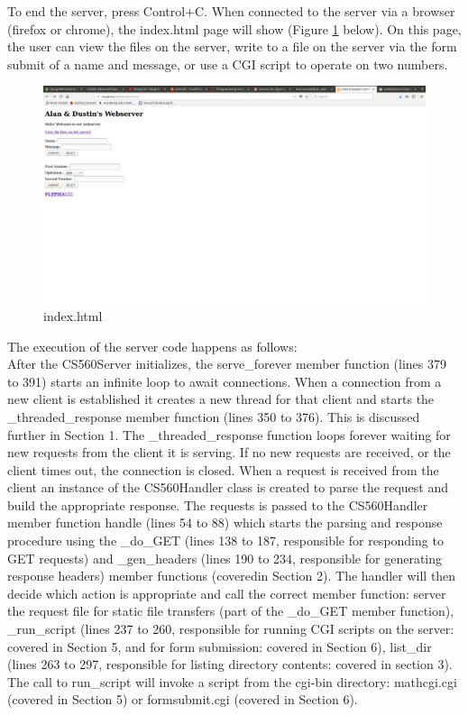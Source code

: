 \documentclass{article}
\begin{document}
To end the server, press Control+C. When connected to the server via a browser (firefox or chrome), the index.html page will show (Figure \ref{fig:index} below). On this page, the user can view the files on the server, write to a file on the server via the form submit of a name and message, or use a CGI script to operate on two numbers.
\begin{figure}[H]
	\includegraphics[width=\textwidth]{index.png}
	\centering
	\caption{index.html}
	\label{fig:index}
\end{figure}
The execution of the server code happens as follows: \\

After the CS560Server initializes, the serve\_forever member function (lines 379 to 391) starts an infinite loop to await connections. When a connection from a new client is established it creates a new thread for that client and starts the \_threaded\_response member function (lines 350 to 376). This is discussed further in Section 1. The \_threaded\_response function loops forever waiting for new requests from the client it is serving. If no new requests are received, or the client times out, the connection is closed. When a request is received from the client an instance of the CS560Handler class is created to parse the request and build the appropriate response. The requests is passed to the  CS560Handler member function handle (lines 54 to 88) which starts the parsing and response procedure using the \_do\_GET (lines 138 to 187, responsible for responding to GET requests) and \_gen\_headers (lines 190 to 234, responsible for generating response headers) member functions (coveredin Section 2). The handler will then decide which action is appropriate and call the correct member function:  server the request file for static file transfers (part of the \_do\_GET member function), \_run\_script (lines 237 to 260, responsible for running CGI scripts on the server: covered in Section 5, and for form submission: covered in Section 6), list\_dir (lines 263 to 297, responsible for listing directory contents: covered in section 3). The call to run\_script will invoke a script from the cgi-bin directory: mathcgi.cgi (covered in Section 5) or formsubmit.cgi (covered in Section 6). 
\end{document}

